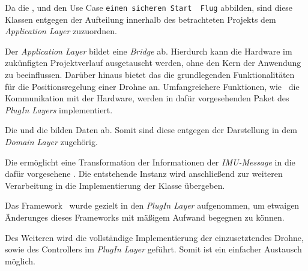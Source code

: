 Da die ,  und  den Use Case \texttt{ einen sicheren Start \bzw\ Flug\grq} abbilden, sind diese Klassen entgegen der Aufteilung innerhalb des betrachteten Projekts dem \textit{Application Layer} zuzuordnen.



Der \textit{Application Layer} bildet eine \textit{Bridge} ab. Hierdurch kann die Hardware im zukünfigten Projektverlauf ausgetauscht werden, ohne den Kern der Anwendung zu beeinflussen.
Darüber hinaus bietet das  die grundlegenden Funktionalitäten für die Positionsregelung einer Drohne an. Umfangreichere Funktionen, wie \zB\ die Kommunikation mit der Hardware, werden in dafür vorgesehenden Paket des \textit{PlugIn Layers} implementiert. 

Die  und die  bilden Daten ab. Somit sind diese entgegen der Darstellung in  dem \textit{Domain Layer} zugehörig.



Die  ermöglicht eine Transformation der Informationen der \textit{IMU-Message} in die dafür vorgesehene . Die entstehende Instanz wird anschließend zur weiteren Verarbeitung in die Implementierung der Klasse  übergeben.



Das Framework \ROS\ wurde gezielt in den \textit{PlugIn Layer} aufgenommen, um etwaigen Änderunges dieses Frameworks mit mäßigem Aufwand begegnen zu können.

Des Weiteren wird die vollständige Implementierung der einzusetztendes Drohne, sowie des Controllers im \textit{PlugIn Layer} geführt. Somit ist ein einfacher Austausch möglich.















